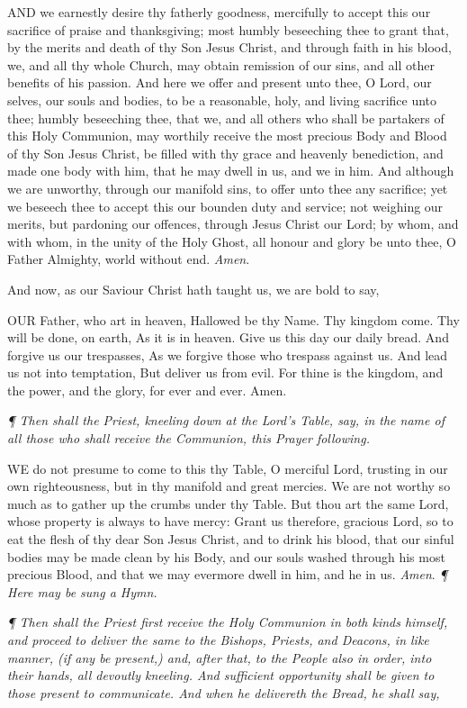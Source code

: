 AND
we earnestly desire thy fatherly goodness, mercifully to accept this our
sacrifice of praise and thanksgiving; most humbly beseeching thee to grant
that, by the merits and death of thy Son Jesus Christ, and through faith
in his blood, we, and all thy whole Church, may obtain remission of our
sins, and all other benefits of his passion. And here we offer and present
unto thee, O Lord, our selves, our souls and bodies, to be a reasonable,
holy, and living sacrifice unto thee; humbly beseeching thee, that we,
and all others who shall be partakers of this Holy Communion, may worthily
receive the most precious Body and Blood of thy Son Jesus Christ, be filled
with thy grace and heavenly benediction, and made one body with him, that
he may dwell in us, and we in him. And although we are unworthy, through
our manifold sins, to offer unto thee any sacrifice; yet we beseech thee
to accept this our bounden duty and service; not weighing our merits,
but pardoning our offences, through Jesus Christ our Lord; by whom, and
with whom, in the unity of the Holy Ghost, all honour and glory be unto
thee, O Father Almighty, world without end. \emph{Amen}.

And now, as our Saviour Christ hath taught us, we are bold to say,

OUR
Father, who art in heaven, Hallowed be thy Name. Thy kingdom come. Thy
will be done, on earth, As it is in heaven. Give us this day our daily
bread. And forgive us our trespasses, As we forgive those who trespass
against us. And lead us not into temptation, But deliver us from evil.
For thine is the kingdom, and the power, and the glory, for ever and ever.
Amen.

\emph{¶
Then shall the Priest, kneeling down at the Lord’s Table, say, in
the name of all those who shall receive the Communion, this Prayer following.}

WE
do not presume to come to this thy Table, O merciful Lord, trusting in
our own righteousness, but in thy manifold and great mercies. We are not
worthy so much as to gather up the crumbs under thy Table. But thou art
the same Lord, whose property is always to have mercy: Grant us therefore,
gracious Lord, so to eat the flesh of thy dear Son Jesus Christ, and to
drink his blood, that our sinful bodies may be made clean by his Body,
and our souls washed through his most precious Blood, and that we may
evermore dwell in him, and he in us. \emph{Amen}.
\emph{¶ Here
may be sung a Hymn.}

\emph{¶
Then shall the Priest first receive the Holy Communion in both kinds
himself, and proceed to deliver the same to the Bishops, Priests,
and Deacons, in like manner, (if any be present,) and, after
that, to the People also in order, into their hands, all devoutly
kneeling. And sufficient opportunity shall be given to those
present to communicate. And when he delivereth the Bread, he
shall say,}

